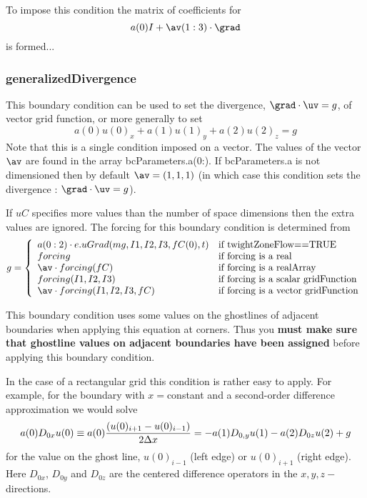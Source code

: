 To impose this condition the matrix of coefficients for 
$$
   a(0) I + \av(1:3)\cdot\grad
$$
is formed...

\subsubsection{generalizedDivergence}
This boundary condition can be used to set the divergence, $\grad\cdot\uv=g$, of vector grid function, 
or more generally to set
\[
    a(0) u(0)_x + a(1) u(1)_y + a(2) u(2)_z = g
\]
Note that this is a single condition imposed on a vector.
The values of the vector $\av$ are found in the array {\ff bcParameters.a(0:)}.  If {\ff
bcParameters.a} is not dimensioned then by default $\av=(1,1,1)$
(in which case this condition sets the divergence : $\grad\cdot\uv=g$).

If $uC$ specifies more values than the number of space dimensions then the extra values are
ignored. The forcing for this boundary condition is determined from
\[
 g =  \left\{ \begin{array}{ll}
        a(0:2) \cdot \true uGrad(mg,I1,I2,I3,fC(0),t) & \mbox{if twightZoneFlow==TRUE} \\
        forcing              & \mbox{if forcing is a real      } \\
        \av\cdot forcing(fC)           & \mbox{if forcing  is a realArray      } \\
        forcing(I1,I2,I3)  & \mbox{if forcing is a scalar gridFunction} \\
        \av\cdot forcing(I1,I2,I3,fC)  & \mbox{if forcing is a vector gridFunction} \\
          \end{array}
  \right.
\]

This boundary condition uses some values on the ghostlines of adjacent boundaries when applying
this equation at corners. Thus you {\bf must make sure that ghostline values on adjacent boundaries
have been assigned} before applying this boundary condition. 

  In the case of a rectangular grid this condition is rather easy to apply. For example,
for the boundary with $x=$constant and a second-order difference approximation we would solve
\[
   a(0) D_{0x} u(0) \equiv a(0) { (u(0)_{i+1} - u(0)_{i-1}) \over 2 \Delta x } = - a(1) D_{0,y} u(1) - a(2) D_{0z} u(2) + g
\]
for the value on the ghost line, $u(0)_{i-1}$ (left edge) or $u(0)_{i+1}$ (right edge). Here 
$D_{0x}$, $D_{0y}$ and $D_{0z}$ are the
centered difference operators in the $x,y,z-$directions.


